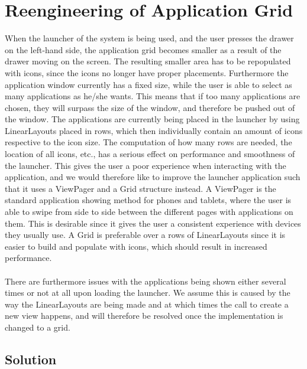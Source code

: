 
\section{Reengineering of Application Grid}
\label{sec:reengineering_of_application_grid}

When the launcher of the \giraf system is being used, and the user presses the drawer on the left-hand side, the application grid becomes smaller as a result of the drawer moving on the screen. The resulting smaller area has to be repopulated with icons, since the icons no longer have proper placements. Furthermore the application window currently has a fixed size, while the user is able to select as many applications as he/she wants. This means that if too many applications are chosen, they will surpass the size of the window, and therefore be pushed out of the window.
The applications are currently being placed in the launcher by using LinearLayouts placed in rows, which then individually contain an amount of icons respective to the icon size. The computation of how many rows are needed, the location of all icons, etc., has a serious effect on performance and smoothness of the launcher. This gives the user a poor experience when interacting with the application, and we would therefore like to improve the launcher application such that it uses a ViewPager and a Grid structure instead. A ViewPager is the standard application showing method for phones and tablets, where the user is able to swipe from side to side between the different pages with applications on them. This is desirable since it gives the user a consistent experience with devices they usually use. A Grid is preferable over a rows of LinearLayouts since it is easier to build and populate with icons, which should result in increased performance. 
\\\\
There are furthermore issues with the applications being shown either several times or not at all upon loading the launcher. We assume this is caused by the way the LinearLayouts are being made and at which times the call to create a new view happens, and will therefore be resolved once the implementation is changed to a grid. 

\subsection{Solution}
\label{sub:reengineering_of_application_grid_solution}

